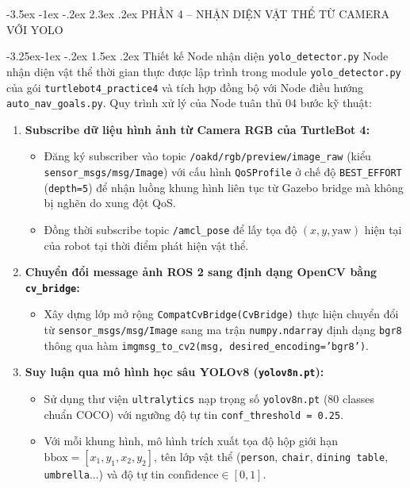 \documentclass[11pt,a4paper]{article}
\makeatletter
\renewcommand{\section}{\@startsection{section}{1}{\z@}%
  {-3.5ex \@plus -1ex \@minus -.2ex}%
  {2.3ex \@plus.2ex}%
  {\normalfont\large\bfseries\color{primary}}}
\renewcommand{\subsection}{\@startsection{subsection}{2}{\z@}%
  {-3.25ex\@plus -1ex \@minus -.2ex}%
  {1.5ex \@plus .2ex}%
  {\normalfont\normalsize\bfseries\color{secondary}}}
\makeatother
\begin{document}
\section{PHẦN 4 – NHẬN DIỆN VẬT THỂ TỪ CAMERA VỚI YOLO}

\subsection{Thiết kế Node nhận diện \texttt{yolo\_detector.py}}
Node nhận diện vật thể thời gian thực được lập trình trong module \texttt{yolo\_detector.py} của gói \texttt{turtlebot4\_practice4} và tích hợp đồng bộ với Node điều hướng \texttt{auto\_nav\_goals.py}. Quy trình xử lý của Node tuân thủ 04 bước kỹ thuật:

\begin{enumerate}
  \item \textbf{Subscribe dữ liệu hình ảnh từ Camera RGB của TurtleBot 4:}
  \begin{itemize}
    \item Đăng ký subscriber vào topic \texttt{/oakd/rgb/preview/image\_raw} (kiểu \texttt{sensor\_msgs/msg/Image}) với cấu hình \texttt{QoSProfile} ở chế độ \texttt{BEST\_EFFORT} (\texttt{depth=5}) để nhận luồng khung hình liên tục từ Gazebo bridge mà không bị nghẽn do xung đột QoS.
    \item Đồng thời subscribe topic \texttt{/amcl\_pose} để lấy tọa độ $(x, y, \text{yaw})$ hiện tại của robot tại thời điểm phát hiện vật thể.
  \end{itemize}
  \item \textbf{Chuyển đổi message ảnh ROS 2 sang định dạng OpenCV bằng \texttt{cv\_bridge}:}
  \begin{itemize}
    \item Xây dựng lớp mở rộng \texttt{CompatCvBridge(CvBridge)} thực hiện chuyển đổi từ \texttt{sensor\_msgs/msg/Image} sang ma trận \texttt{numpy.ndarray} định dạng \texttt{bgr8} thông qua hàm \texttt{imgmsg\_to\_cv2(msg, desired\_encoding='bgr8')}.
  \end{itemize}
  \item \textbf{Suy luận qua mô hình học sâu YOLOv8 (\texttt{yolov8n.pt}):}
  \begin{itemize}
    \item Sử dụng thư viện \texttt{ultralytics} nạp trọng số \texttt{yolov8n.pt} (80 classes chuẩn COCO) với ngưỡng độ tự tin \texttt{conf\_threshold = 0.25}.
    \item Với mỗi khung hình, mô hình trích xuất tọa độ hộp giới hạn $\text{bbox} = [x_1, y_1, x_2, y_2]$, tên lớp vật thể (\texttt{person}, \texttt{chair}, \texttt{dining table}, \texttt{umbrella}...) và độ tự tin $\text{confidence} \in [0, 1]$.

\end{itemize}
\end{enumerate}
\end{document}
